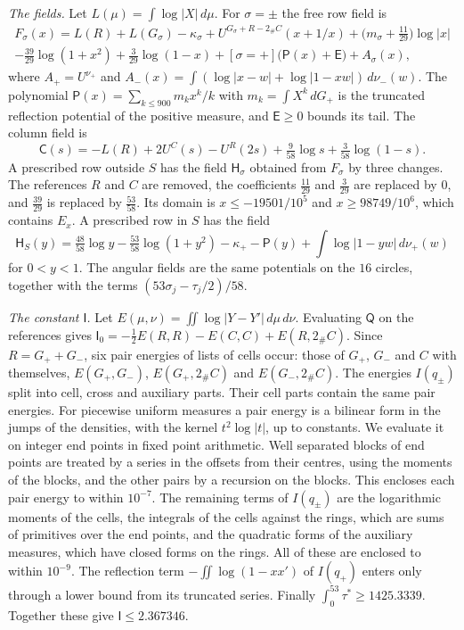 \emph{The fields.} Let $L(\mu)=\int\log|X|\,d\mu$. For $\sigma=\pm$ the free row field is
\begin{multline*}
 F_\sigma(x)=L(R)+L(G_\sigma)-\kappa_\sigma+U^{G_\sigma+R-2_\#C}(x+1/x)+\bigl(m_\sigma+\tfrac{11}{29}\bigr)\log|x|\\
 -\tfrac{39}{29}\log(1+x^2)+\tfrac3{29}\log(1-x)+[\sigma=+]\bigl(\mathsf P(x)+\mathsf E\bigr)+A_\sigma(x),
\end{multline*}
where $A_+=U^{\nu_+}$ and $A_-(x)=\int(\log|x-w|+\log|1-xw|)\,d\nu_-(w)$. The polynomial $\mathsf P(x)=\sum_{k\le900}m_kx^k/k$ with $m_k=\int X^k\,dG_+$ is
the truncated reflection potential of the positive measure, and $\mathsf E\ge0$ bounds its tail.
The column field is
\[
 \mathsf C(s)=-L(R)+2U^C(s)-U^R(2s)+\tfrac9{58}\log s+\tfrac3{58}\log(1-s).
\]
A prescribed row outside $S$ has the field $\mathsf H_\sigma$ obtained from $F_\sigma$ by three changes. The references $R$ and $C$ are removed, the
coefficients $\frac{11}{29}$ and $\frac3{29}$ are replaced by $0$, and $\frac{39}{29}$ is replaced by $\frac{53}{58}$. Its domain is
$x\le-19501/10^5$ and $x\ge98749/10^6$, which contains $E_x$. A prescribed row in $S$ has the field
\[
 \mathsf H_S(y)=\tfrac{48}{58}\log y-\tfrac{53}{58}\log(1+y^2)-\kappa_+-\mathsf P(y)+\int\log|1-yw|\,d\nu_+(w)
\]
for $0<y<1$.
The angular fields are the same potentials on the $16$ circles, together with the terms $(53\sigma_j-\tau_j/2)/58$.

\emph{The constant $\mathsf I$.} Let $E(\mu,\nu)=\iint\log|Y-Y'|\,d\mu\,d\nu$. Evaluating $\mathsf Q$ on the references gives $\mathsf I_0=-\frac12E(R,R)-E(C,C)+E(R,2_\#C)$. Since $R=G_++G_-$, six pair
energies of lists of cells occur: those of $G_+$, $G_-$ and $C$ with themselves, $E(G_+,G_-)$, $E(G_+,2_\#C)$ and $E(G_-,2_\#C)$. The energies $I(q_\pm)$ split into cell, cross and auxiliary parts. Their cell parts contain the same
pair energies. For piecewise uniform measures a pair energy is a bilinear form in the jumps of the densities, with the kernel $t^2\log|t|$, up to constants. We evaluate it on integer end points in fixed point arithmetic. Well separated blocks of end points are
treated by a series in the offsets from their centres, using the moments of the blocks, and the other pairs by a recursion on the blocks. This encloses each pair energy to within $10^{-7}$. The remaining terms of $I(q_\pm)$ are the logarithmic moments of the cells,
the integrals of the cells against the rings, which are sums of primitives over the end points, and the quadratic forms of the auxiliary measures, which have closed forms on the rings. All of these are enclosed to within $10^{-9}$. The reflection term $-\iint\log(1-xx')$ of $I(q_+)$
enters only through a lower bound from its truncated series. Finally $\int_0^{53}\tau^*\ge1425.3339$. Together these give $\mathsf I\le2.367346$.

